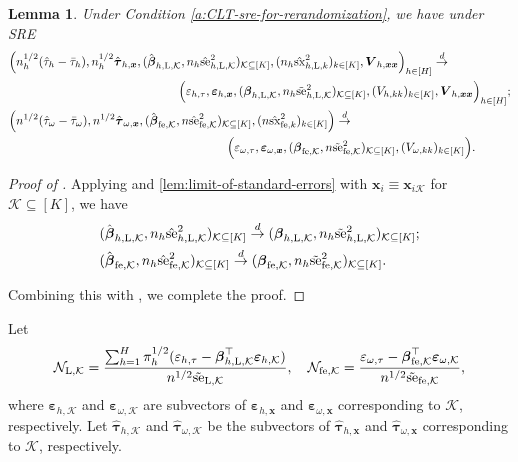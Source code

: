 \documentclass[12pt]{article}
\newtheorem{lemma}{Lemma}
\newcommand{\se}{\textnormal{se}}
\newcommand{\Lin}{\textnormal{L}}
\newcommand{\wconv}{\stackrel{d}{\rightarrow}}
\newcommand{\mk}{\mathcal{K}}
\newcommand{\fe}{\textnormal{fe}}
\newcommand{\bs}{\boldsymbol}
\newcommand{\sx}{\textnormal{sx}}
\begin{document}
 \begin{lemma}
 \label{lem:summary-weak-convergence}
    Under Condition \ref{a:CLT-sre-for-rerandomization}, we have under SRE
    \begin{align*}
        &\Big(n_h^{1/2}(\hat{\tau}_{h}-\bar{\tau}_h), n_h^{1/2}\hat{\bs{\tau}}_{h,\bs{x}},(\hat{\bs{\beta}}_{h,\Lin,\mk}, n_h \hat{\se}_{h,\Lin,\mk}^2)_{\mk\subseteq [K]} , (n_h \hat{\sx}^2_{h,\Lin,k})_{k\in [K]} , \bs{V}_{h,\bs{x}\bs{x}}\Big)_{h\in [H]} \wconv \\
        &
\qquad\qquad\qquad\qquad\qquad\qquad\qquad\Big(\varepsilon_{h,\tau}, \bs{\varepsilon}_{h,\bs{x}}, (\bs{\beta}_{h,\Lin,\mk}, n_h \tilde{\se}_{h,\Lin,\mk}^2)_{\mk\subseteq [K]}, (V_{h,kk})_{k \in [K]}, \bs{V}_{h,\bs{x}\bs{x}}\Big)_{h \in [H]};\\
      &\Big(n^{1/2}(\hat{\tau}_{\omega}-\bar{\tau}_{\omega}), n^{1/2}\hat{\bs{\tau}}_{\omega,\bs{x}},(\hat{\bs{\beta}}_{\fe ,\mk}, n\hat{\se}_{\fe ,\mk}^2)_{\mk\subseteq [K]} , (n\hat{\sx}^2_{\fe ,k})_{k\in [K]}\Big) \wconv \\
      &
      \qquad\qquad\qquad\qquad\qquad\qquad\qquad\qquad\qquad\Big(\varepsilon_{\omega,\tau}, \bs{\varepsilon}_{\omega,\bs{x}}, (\bs{\beta}_{\fe ,\mk}, n \tilde{\se}_{\fe ,\mk}^2)_{\mk\subseteq [K]}, (V_{\omega,kk})_{k\in [K]}\Big).
    \end{align*}
    \end{lemma}   
\begin{proof}[Proof of ]
   Applying  and \ref{lem:limit-of-standard-errors} with $\bs{x}_i \equiv \bs{x}_{i\mk}$ for $\mk \subseteq [K]$, we have
   \begin{align*}
       & (\hat{\bs{\beta}}_{h,\Lin,\mk}, n_h \hat{\se}_{h,\Lin,\mk}^2)_{\mk\subseteq [K]} \wconv (\bs{\beta}_{h,\Lin,\mk}, n_h \tilde{\se}_{h,\Lin,\mk}^2)_{\mk\subseteq [K]};\\
       & (\hat{\bs{\beta}}_{\fe ,\mk}, n_h \hat{\se}_{\fe ,\mk}^2)_{\mk\subseteq [K]} \wconv (\bs{\beta}_{\fe ,\mk}, n_h \tilde{\se}_{\fe ,\mk}^2)_{\mk\subseteq [K]}.
   \end{align*}
   
  Combining this with , we complete the proof.
\end{proof}

Let 
\begin{align}
\label{eq:def-of-Nlk-Nfek}
    \mathcal{N}_{\Lin,\mk} = \frac{\sum_{h=1}^H \pi_h^{1/2}(\varepsilon_{h,\tau}-\bs{\beta}_{h,\Lin, \mk}^\top \bs{\varepsilon}_{h,\mk}) }{n^{1/2}\tilde{\se}_{\Lin, \mk}}, \quad \mathcal{N}_{\fe ,\mk} = \frac{\varepsilon_{\omega,\tau}-\bs{\beta}_{\fe ,\mk}^\top \bs{\varepsilon}_{\omega,\mk}}{n^{1/2}\tilde{\se}_{\fe , \mk}},
\end{align}
where $\bs{\varepsilon}_{h,\mk}$ and $\bs{\varepsilon}_{\omega,\mk}$ are subvectors of $\bs{\varepsilon}_{h,\bs{x}}$ and $\bs{\varepsilon}_{\omega,\bs{x}}$ corresponding to $\mk$, respectively. Let $\hat{\bs{\tau}}_{h,\mk}$ and $\hat{\bs{\tau}}_{\omega,\mk}$ be the subvectors of $\hat{\bs{\tau}}_{h,\bs{x}}$ and $\hat{\bs{\tau}}_{\omega,\bs{x}}$ corresponding to $\mk$, respectively.
\end{document}
